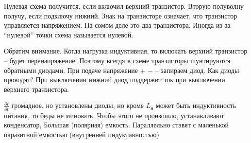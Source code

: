 Нулевая схема получится, если включил верхний транзистор. Вторую полуволну получу, если подключу нижний. Знак на транзисторе означает, что транзистор управляется напряжением.
На сомом деле это два транзистора. Иногда из-за ``нулевой'' точки схема называется нулевой.

Обратим внимание. Когда нагрузка индуктивная, то включать верхний транзистор -- будет перенапряжение. Поэтому всегдя в схеме транзисторы шунтируются обратными
диодами. При подаче напряжение $+$ $-$ -- запираем диод. Как диоды проводят? При выключении нижний диод поддержит ток при выключении верхнего транзистора. %

${\displaystyle \frac{\partial i}{\partial t}}$ громадное, но установлены диоды, но кроме $L_\text{н}$ может быть индуктивность питания, то беды не миновать.
Чтобы этого не произошло, устанавливают конденсатор, Большая (полярная) емкость. Параллельно ставят с маленькой паразитной емкостью (внутренней индуктивностью)

